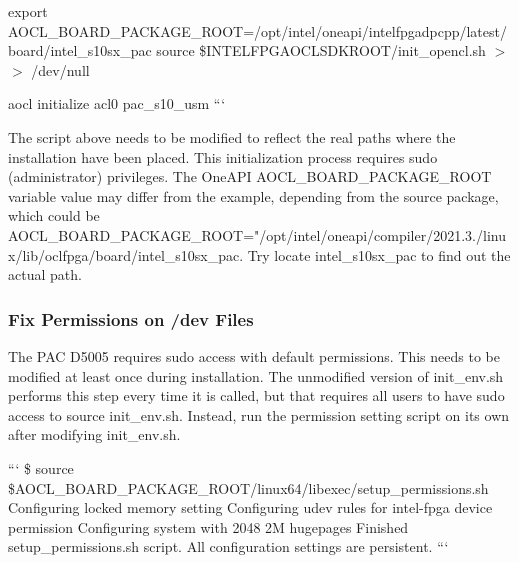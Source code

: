 export A\-O\-C\-L\-\_\-\-B\-O\-A\-R\-D\-\_\-\-P\-A\-C\-K\-A\-G\-E\-\_\-\-R\-O\-O\-T=/opt/intel/oneapi/intelfpgadpcpp/latest/board/intel\-\_\-s10sx\-\_\-pac source \$\-I\-N\-T\-E\-L\-F\-P\-G\-A\-O\-C\-L\-S\-D\-K\-R\-O\-O\-T/init\-\_\-opencl.sh $>$$>$ /dev/null

aocl initialize acl0 pac\-\_\-s10\-\_\-usm ```

The script above needs to be modified to reflect the real paths where the installation have been placed. This initialization process requires sudo (administrator) privileges. The One\-A\-P\-I {\ttfamily A\-O\-C\-L\-\_\-\-B\-O\-A\-R\-D\-\_\-\-P\-A\-C\-K\-A\-G\-E\-\_\-\-R\-O\-O\-T} variable value may differ from the example, depending from the source package, which could be {\ttfamily A\-O\-C\-L\-\_\-\-B\-O\-A\-R\-D\-\_\-\-P\-A\-C\-K\-A\-G\-E\-\_\-\-R\-O\-O\-T="/opt/intel/oneapi/compiler/2021.3./linux/lib/oclfpga/board/intel\-\_\-s10sx\-\_\-pac}. Try {\ttfamily locate intel\-\_\-s10sx\-\_\-pac} to find out the actual path.

\subsubsection*{Fix Permissions on /dev Files}

The P\-A\-C D5005 requires sudo access with default permissions. This needs to be modified at least once during installation. The unmodified version of {\ttfamily init\-\_\-env.\-sh} performs this step every time it is called, but that requires all users to have sudo access to source {\ttfamily init\-\_\-env.\-sh}. Instead, run the permission setting script on its own after modifying {\ttfamily init\-\_\-env.\-sh}.

``` \$ source \$\-A\-O\-C\-L\-\_\-\-B\-O\-A\-R\-D\-\_\-\-P\-A\-C\-K\-A\-G\-E\-\_\-\-R\-O\-O\-T/linux64/libexec/setup\-\_\-permissions.sh Configuring locked memory setting Configuring udev rules for intel-\/fpga device permission Configuring system with 2048 2\-M hugepages Finished setup\-\_\-permissions.\-sh script. All configuration settings are persistent. ``` 